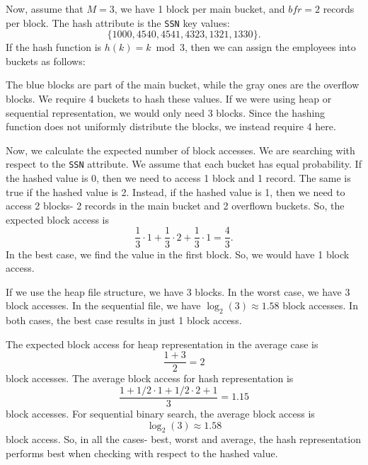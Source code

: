 \documentclass[a4paper, openany]{memoir}
\begin{document}
Now, assume that $M = 3$, we have 1 block per main bucket, and $\textit{bfr} = 2$ records per block. The hash attribute is the \texttt{SSN} key values:
\[\{1000, 4540, 4541, 4323, 1321, 1330\}.\]
If the hash function is $h(k) = k \bmod{3}$, then we can assign the employees into buckets as follows:
\begin{figure}[H]
    \centering
\end{figure}
\noindent The blue blocks are part of the main bucket, while the gray ones are the overflow blocks. We require 4 buckets to hash these values. If we were using heap or sequential representation, we would only need 3 blocks. Since the hashing function does not uniformly distribute the blocks, we instead require 4 here.

Now, we calculate the expected number of block accesses. We are searching with respect to the \texttt{SSN} attribute. We assume that each bucket has equal probability. If the hashed value is 0, then we need to access 1 block and 1 record. The same is true if the hashed value is 2. Instead, if the hashed value is 1, then we need to access 2 blocks- 2 records in the main bucket and 2 overflown buckets. So, the expected block access is
\[\frac{1}{3} \cdot 1 + \frac{1}{3} \cdot 2 + \frac{1}{3} \cdot 1 = \frac{4}{3}.\]
In the best case, we find the value in the first block. So, we would have 1 block access.

If we use the heap file structure, we have 3 blocks. In the worst case, we have 3 block accesses. In the sequential file, we have $\log_2(3) \approx 1.58$ block accesses. In both cases, the best case results in just 1 block access. 

The expected block access for heap representation in the average case is
\[\frac{1 + 3}{2} = 2\]
block accesses. The average block access for hash representation is
\[\frac{1 + 1/2 \cdot 1 + 1/2 \cdot 2 + 1}{3} = 1.15\]
block accesses. For sequential binary search, the average block access is
\[\log_2(3) \approx 1.58\]
block access. So, in all the cases- best, worst and average, the hash representation performs best when checking with respect to the hashed value.
\end{document}
